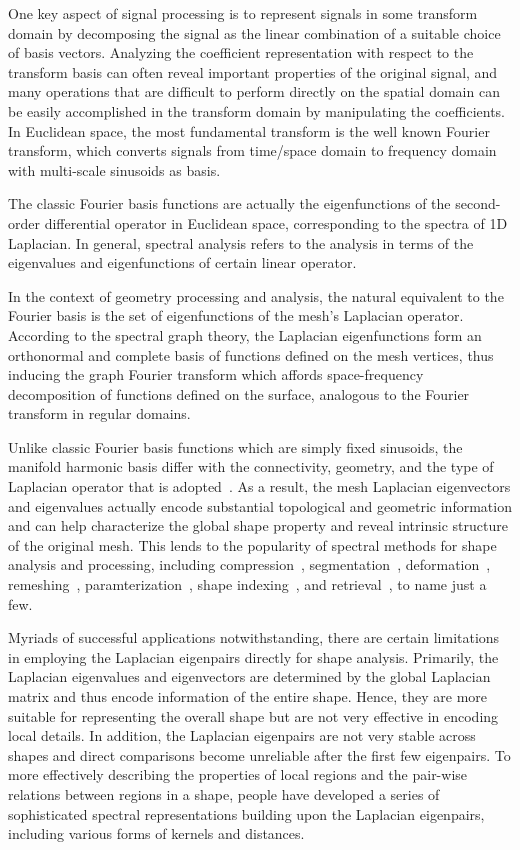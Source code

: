 One key aspect of signal processing is to represent signals in some transform 
domain by decomposing the signal as the linear combination of a suitable choice of basis 
vectors. Analyzing the coefficient representation with respect to the transform
basis can often reveal important properties of the original signal, and many
operations that are difficult to perform directly on the spatial domain
can be easily accomplished in the transform domain by manipulating the
coefficients. In Euclidean space, the most fundamental transform
is the well known Fourier transform, which converts signals from time/space domain to
frequency domain with multi-scale sinusoids as basis. 

The classic Fourier basis functions are actually the eigenfunctions of the second-order 
differential operator in Euclidean space, corresponding to the spectra of 1D Laplacian.
In general, spectral analysis refers to the analysis in terms of the
eigenvalues and eigenfunctions of certain linear operator. 

In the context of geometry processing and analysis, the natural equivalent to the 
Fourier basis is the set of eigenfunctions of the mesh's Laplacian operator.
According to the spectral graph theory, the Laplacian eigenfunctions form an 
orthonormal and complete basis of functions defined on the mesh vertices, thus inducing the
graph Fourier transform which affords space-frequency decomposition of functions defined on 
the surface, analogous to the Fourier transform in regular domains. 

Unlike classic Fourier basis functions which are simply fixed sinusoids, the manifold harmonic 
basis differ with the connectivity, geometry, and the type of Laplacian operator that is 
adopted~\cite{Zhang:2010:CGF}. As a result, the mesh Laplacian eigenvectors and eigenvalues 
actually encode substantial topological and geometric information and can help characterize 
the global shape property and reveal intrinsic structure of the original mesh. This lends 
to the popularity of spectral methods for shape analysis and processing, including 
compression~\cite{Karni2000}, segmentation~\cite{Liu2007}, deformation~\cite{Rong2008}, 
remeshing~\cite{dong2006spectral}, paramterization~\cite{Zhou2004}, shape indexing~\cite{Reuter:2006:CAD},
and retrieval~\cite{Lavoue:2012}, to name just a few.

Myriads of successful applications notwithstanding, there are certain 
limitations in employing the Laplacian eigenpairs directly for shape analysis. 
Primarily, the Laplacian eigenvalues and eigenvectors are determined by the 
global Laplacian matrix and thus encode information of the entire shape. 
Hence, they are more suitable for representing the overall shape but are not 
very effective in encoding local details. In addition, the Laplacian eigenpairs 
are not very stable across shapes and direct comparisons become unreliable 
after the first few eigenpairs. To more effectively describing the properties 
of local regions and the pair-wise relations between regions in a shape, people
have developed a series of sophisticated spectral representations building upon 
the Laplacian eigenpairs, including various forms of kernels and distances.

